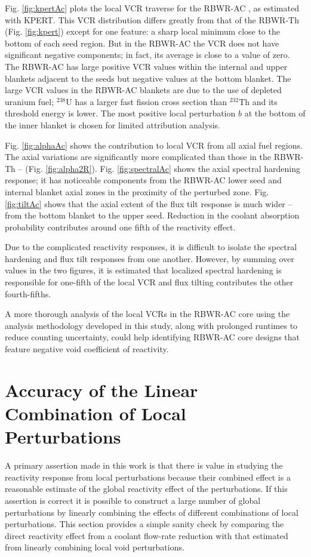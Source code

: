 \documentclass[11pt]{article}
\newcommand{\iso}[2]{$^{#2}\mathrm{#1}$}
\begin{document}
Fig. \ref{fig:kpertAc} plots the local VCR traverse for the RBWR-AC \cite{takeda2007blt}, as estimated with KPERT.
This VCR distribution differs greatly from that of the RBWR-Th (Fig. \ref{fig:kpert}) except for one feature: a sharp local minimum close to the bottom of each seed region.
But in the RBWR-AC the VCR does not have significant negative components; in fact, its average is close to a value of zero.
The RBWR-AC has large positive VCR values within the internal and upper blankets adjacent to the seeds but negative values at the bottom blanket.
The large VCR values in the RBWR-AC blankets are due to the use of depleted uranium fuel; \iso{U}{238} has a larger fast fission cross section than \iso{Th}{232} and its threshold energy is lower.
The most positive local perturbation $b$ at the bottom of the inner blanket is chosen for limited attribution analysis.

Fig. \ref{fig:alphaAc} shows the contribution to local VCR from all axial fuel regions.
The axial variations are significantly more complicated than those in the RBWR-Th -- (Fig. \ref{fig:alpha2R}).
Fig. \ref{fig:spectralAc} shows the axial spectral hardening response; it has noticeable components from the RBWR-AC lower seed and internal blanket axial zones in the proximity of the perturbed zone.
Fig. \ref{fig:tiltAc} shows that the axial extent of the flux tilt response is much wider -- from the bottom blanket to the upper seed.
Reduction in the coolant absorption probability contributes around one fifth of the reactivity effect.

Due to the complicated reactivity responses, it is difficult to isolate the spectral hardening and flux tilt responses from one another.
However, by summing over values in the two figures, it is estimated that localized spectral hardening is responsible for one-fifth of the local VCR and flux tilting contributes the other fourth-fifths.

A more thorough analysis of the local VCRs in the RBWR-AC core using the analysis methodology developed in this study, along with prolonged runtimes to reduce counting uncertainty, could help identifying RBWR-AC core designs that feature negative void coefficient of reactivity.

\section{Accuracy of the Linear Combination of Local Perturbations}
\label{sec:accuracy}

A primary assertion made in this work is that there is value in studying the reactivity response from local perturbations because their combined effect is a reasonable estimate of the global reactivity effect of the perturbations.
If this assertion is correct it is possible to construct a large number of global perturbations by linearly combining the effects of different combinations of local perturbations.
This section provides a simple sanity check by comparing the direct reactivity effect from a coolant flow-rate reduction with that estimated from linearly combining local void perturbations.
\end{document}
